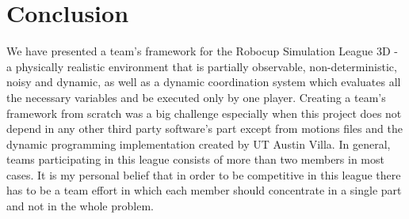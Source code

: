 \chapter{Conclusion}
\label{conclusion}

We have presented a team's framework for the Robocup Simulation League 3D - a physically realistic environment that is partially observable, non-deterministic, noisy and dynamic, as well as a dynamic coordination system which evaluates all the necessary variables and be executed only by one player. Creating a team's framework from scratch was a big challenge especially when this project does not depend in any other third party software's part except from motions files and the dynamic programming implementation created by UT Austin Villa. In general, teams participating in this league consists of more than two members in most cases. It is my personal belief that in order to be competitive in this league there has to be a team effort in which each member should concentrate in a single part and not in the whole problem.
 


